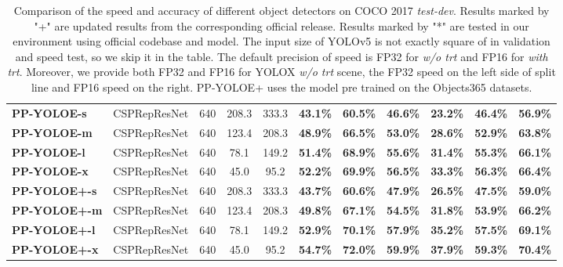\documentclass[final]{cvpr}
\begin{document}
\begin{table*}[ht]
{\begin{tabular}{l|l|c|cc|cccccc}
				\hline
			    \hline
				\textbf{PP-YOLOE-s} & CSPRepResNet & 640 & 208.3 & 333.3 & \textbf{43.1\%} & \textbf{60.5\%} & \textbf{46.6\%} & \textbf{23.2\%} & \textbf{46.4\%} & \textbf{56.9\%} \\
				\textbf{PP-YOLOE-m} & CSPRepResNet & 640 & 123.4 & 208.3 & \textbf{48.9\%} & \textbf{66.5\%} & \textbf{53.0\%} & \textbf{28.6\%} & \textbf{52.9\%} & \textbf{63.8\%} \\
				\textbf{PP-YOLOE-l} & CSPRepResNet & 640 & 78.1 &  149.2 & \textbf{51.4\%} & \textbf{68.9\%} & \textbf{55.6\%} & \textbf{31.4\%} & \textbf{55.3\%} & \textbf{66.1\%} \\
				\textbf{PP-YOLOE-x} & CSPRepResNet & 640 & 45.0 &  95.2 & \textbf{52.2\%} & \textbf{69.9\%} & \textbf{56.5\%} & \textbf{33.3\%} & \textbf{56.3\%} & \textbf{66.4\%} \\
				\hline
				
				\hline
				\hline
				\textbf{PP-YOLOE+-s} & CSPRepResNet & 640 & 208.3 & 333.3 & \textbf{43.7\%} & \textbf{60.6\%} & \textbf{47.9\%} & \textbf{26.5\%} & \textbf{47.5\%} & \textbf{59.0\%} \\
				\textbf{PP-YOLOE+-m} & CSPRepResNet & 640 & 123.4 & 208.3 & \textbf{49.8\%} & \textbf{67.1\%} & \textbf{54.5\%} & \textbf{31.8\%} & \textbf{53.9\%} & \textbf{66.2\%} \\
				\textbf{PP-YOLOE+-l} & CSPRepResNet & 640 & 78.1 &  149.2 & \textbf{52.9\%} & \textbf{70.1\%} & \textbf{57.9\%} & \textbf{35.2\%} & \textbf{57.5\%} & \textbf{69.1\%} \\
				\textbf{PP-YOLOE+-x} & CSPRepResNet & 640 & 45.0 &  95.2 & \textbf{54.7\%} & \textbf{72.0\%} & \textbf{59.9\%} & \textbf{37.9\%} & \textbf{59.3\%} & \textbf{70.4\%} \\
				\hline
			\end{tabular}
		}
		\vspace{0.1cm}
		\caption{Comparison of the speed and accuracy of different object detectors on COCO 2017 \textit{test-dev}. Results marked by "+" are updated results from the corresponding official release. Results marked by "*" are tested in our environment using official codebase and model. The input size of YOLOv5 is not exactly square of  in validation and speed test, so we skip it in the table. The default precision of speed is FP32 for \textit{w/o trt} and FP16 for \textit{with trt}. Moreover, we provide both FP32 and FP16 for YOLOX \textit{w/o trt} scene, the FP32 speed on the left side of split line and FP16 speed on the right. PP-YOLOE+ uses the model pre trained on the Objects365\cite{2020Objects365} datasets.
		}
		\label{tab-state-of-the-art}
\end{table*}
\end{document}
